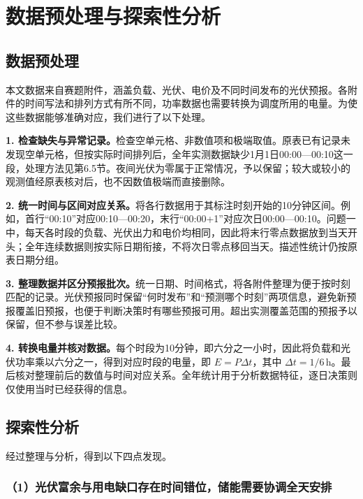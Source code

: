 \newpage
\section{数据预处理与探索性分析}

\subsection{数据预处理}

本文数据来自赛题附件，涵盖负载、光伏、电价及不同时间发布的光伏预报。各附件的时间写法和排列方式有所不同，功率数据也需要转换为调度所用的电量。为使这些数据能够准确对应，我们进行了以下处理。

\noindent\textbf{1. 检查缺失与异常记录。}检查空单元格、非数值项和极端取值。原表已有记录未发现空单元格，但按实际时间排列后，全年实测数据缺少1月1日00:00—00:10这一段，处理方法见第6.5节。夜间光伏为零属于正常情况，予以保留；较大或较小的观测值经原表核对后，也不因数值极端而直接删除。

\noindent\textbf{2. 统一时间与区间对应关系。}将各行数据用于其标注时刻开始的10分钟区间。例如，首行“00:10”对应00:10—00:20，末行“00:00+1”对应次日00:00—00:10。问题一中，每天各时段的负载、光伏出力和电价均相同，因此将末行零点数据放到当天开头；全年连续数据则按实际日期衔接，不将次日零点移回当天。描述性统计仍按原表日期分组。

\noindent\textbf{3. 整理数据并区分预报批次。}统一日期、时间格式，将各附件整理为便于按时刻匹配的记录。光伏预报同时保留“何时发布”和“预测哪个时刻”两项信息，避免新预报覆盖旧预报，也便于判断决策时有哪些预报可用。超出实测覆盖范围的预报予以保留，但不参与误差比较。

\noindent\textbf{4. 转换电量并核对数据。}每个时段为10分钟，即六分之一小时，因此将负载和光伏功率乘以六分之一，得到对应时段的电量，即 \(E=P\Delta t\)，其中 \(\Delta t=1/6\,\mathrm h\)。最后核对整理前后的数值与时间对应关系。全年统计用于分析数据特征，逐日决策则仅使用当时已经获得的信息。

\newpage
\subsection{探索性分析}

经过整理与分析，得到以下四点发现。

\subsubsection*{（1）光伏富余与用电缺口存在时间错位，储能需要协调全天安排}

